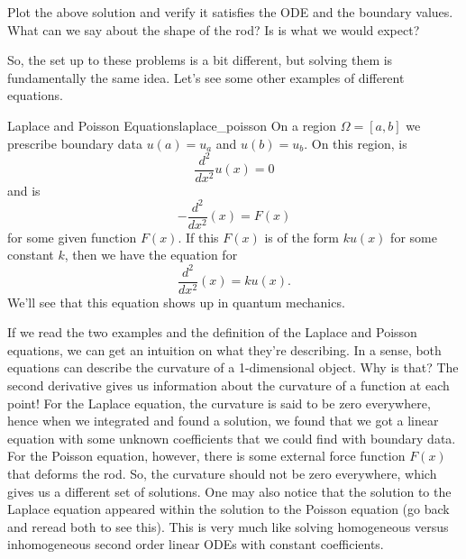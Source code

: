 \begin{exercise}
Plot the above solution and verify it satisfies the ODE and the boundary values.  What can we say about the shape of the rod? Is is what we would expect?
\end{exercise}

So, the set up to these problems is a bit different, but solving them is fundamentally the same idea. Let's see some other examples of different equations.

\begin{df}{Laplace and Poisson Equations}{laplace_poisson}
On a region $\Omega=[a,b]$ we prescribe boundary data $u(a)=u_a$ and $u(b)=u_b$.  On this region,  is
\[
\frac{d^2}{dx^2}u(x)=0
\]
and  is 
\[
-\frac{d^2}{dx^2}(x)=F(x)
\]
for some given function $F(x)$. If this $F(x)$ is of the form $ku(x)$ for some constant $k$, then we have the equation for 
\[
\frac{d^2}{dx^2}(x)=ku(x).
\]
We'll see that this equation shows up in quantum mechanics.
\end{df}

If we read the two examples and the definition of the Laplace and Poisson equations, we can get an intuition on what they're describing.  In a sense, both equations can describe the curvature of a 1-dimensional object.  Why is that? The second derivative gives us information about the curvature of a function at each point! For the Laplace equation, the curvature is said to be zero everywhere, hence when we integrated and found a solution, we found that we got a linear equation with some unknown coefficients that we could find with boundary data.  For the Poisson equation, however, there is some external force function $F(x)$ that deforms the rod.  So, the curvature should not be zero everywhere, which gives us a different set of solutions.  One may also notice that the solution to the Laplace equation appeared within the solution to the Poisson equation (go back and reread both to see this).  This is very much like solving homogeneous versus inhomogeneous second order linear ODEs with constant coefficients.

